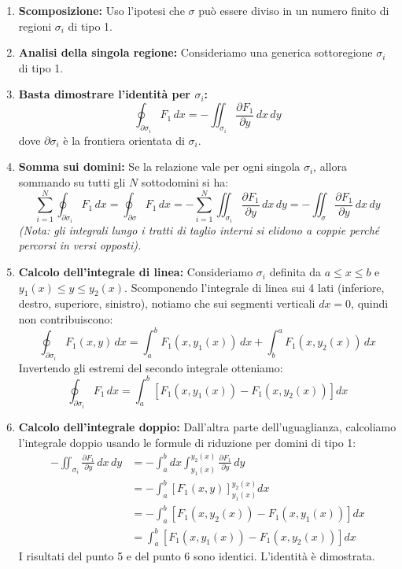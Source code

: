 \begin{enumerate}
    \item \textbf{Scomposizione:} Uso l'ipotesi che $\sigma$ può essere diviso in un numero finito di regioni $\sigma_i$ di tipo 1.
    \item \textbf{Analisi della singola regione:} Consideriamo una generica sottoregione $\sigma_i$ di tipo 1.
    \item \textbf{Basta dimostrare l'identità per $\sigma_i$:} 
    \[
    \oint_{\partial \sigma_i} F_1 \, dx = -\iint_{\sigma_i} \frac{\partial F_1}{\partial y} \, dx \, dy
    \]
    dove $\partial \sigma_i$ è la frontiera orientata di $\sigma_i$.
    \item \textbf{Somma sui domini:} Se la relazione vale per ogni singola $\sigma_i$, allora sommando su tutti gli $N$ sottodomini si ha:
    \[
    \sum_{i=1}^{N} \oint_{\partial \sigma_i} F_1 \, dx = \oint_{\partial \sigma} F_1 \, dx = - \sum_{i=1}^{N} \iint_{\sigma_i} \frac{\partial F_1}{\partial y} \, dx \, dy = - \iint_{\sigma} \frac{\partial F_1}{\partial y} \, dx \, dy
    \]
    \textit{(Nota: gli integrali lungo i tratti di taglio interni si elidono a coppie perché percorsi in versi opposti).}
    
    \item \textbf{Calcolo dell'integrale di linea:} Consideriamo $\sigma_i$ definita da $a \le x \le b$ e $y_1(x) \le y \le y_2(x)$.
    Scomponendo l'integrale di linea sui 4 lati (inferiore, destro, superiore, sinistro), notiamo che sui segmenti verticali $dx = 0$, quindi non contribuiscono:
    \[
    \oint_{\partial \sigma_i} F_1(x,y) \, dx = \int_{a}^{b} F_1(x, y_1(x)) \, dx + \int_{b}^{a} F_1(x, y_2(x)) \, dx
    \]
    Invertendo gli estremi del secondo integrale otteniamo:
    \[
    \oint_{\partial \sigma_i} F_1 \, dx = \int_{a}^{b} \left[ F_1(x, y_1(x)) - F_1(x, y_2(x)) \right] dx
    \]

    \item \textbf{Calcolo dell'integrale doppio:} Dall'altra parte dell'uguaglianza, calcoliamo l'integrale doppio usando le formule di riduzione per domini di tipo 1:
    \begin{align*}
        -\iint_{\sigma_i} \frac{\partial F_1}{\partial y} \, dx \, dy &= - \int_{a}^{b} dx \int_{y_1(x)}^{y_2(x)} \frac{\partial F_1}{\partial y} \, dy \\
        &= - \int_{a}^{b} \left[ F_1(x, y) \right]_{y_1(x)}^{y_2(x)} dx \\
        &= - \int_{a}^{b} \left[ F_1(x, y_2(x)) - F_1(x, y_1(x)) \right] dx \\
        &= \int_{a}^{b} \left[ F_1(x, y_1(x)) - F_1(x, y_2(x)) \right] dx
    \end{align*}    
    I risultati del punto 5 e del punto 6 sono identici. L'identità è dimostrata.
\end{enumerate}

